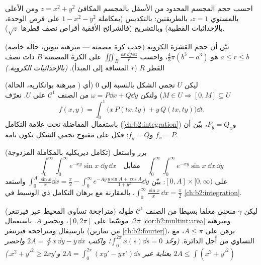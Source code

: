 \begin{exercise}[$\star\star$]\label{exo:b2:multint:6}
احسب حجم المجسم المحدود من الأسفل بالمجسم المكافئ $z
= x^2 + y^2$ ومن الأعلى
بالمستوي $z = 1$، بالطريقتين: بالتكديس (بمكاملة $1 - x^2 - y^2$ على قرص
الوحدة، بالإحداثيات القطبية) وبالتشريح (فالشرائح الأفقية أقراص نصف
قطرها $\sqrt z$).
\end{exercise}

\begin{exercise}[$\star\star$]\label{exo:b2:multint:7}
(جذب كرة مصمتة --- مبرهنة نيوتن، حالة خاصة) بيّن أن حجم القشرة
الكروية $a \leq r \leq
b$ هو $\frac43\pi(b^3 - a^3)$، واحسب $\iiint_{B}
\frac{\dd x\,\dd y\,\dd z}{r}$ على الكرة المصمتة $B$
ذات نصف القطر $R$ ($r$ المسافة إلى المبدأ). \emph{(بالإحداثيات
الكروية.)}
\end{exercise}

\begin{exercise}[$\star\star\star$]\label{exo:b2:multint:8}
(مبرهنة بوانكاريه، الحالة ) ليكن $U$ نجمي الشكل بالنسبة
إلى $0$ (أي $M \in U \Rightarrow [0, M] \subseteq U$) ولتكن $\omega = P\dd x + Q\dd y$  من الصنف $\mathcal{C}^1$
على $U$. نعرّف
\[
f(x, y) = \int_0^1 \bigl(x\,P(tx, ty) + y\,Q(tx, ty)\bigr)\dd t .
\]
باستعمال المفاضلة تحت علامة التكامل (\cref{ch:b2:integration}) و$P_y = Q_x$، بيّن أن
$f_x = P$ و$f_y = Q$: فكل  على مفتوح نجمي الشكل تكون تامة.
\end{exercise}

\begin{exercise}[$\star\star\star$]\label{exo:b2:multint:9}
(تكامل ديريكليه بالمكاملة المزدوجة) برر واستغل
\[
\int_0^\infty\!\!\int_0^\infty e^{-xy}\sin x\;\dd y\,\dd x
\quad\text{مقابل}\quad
\int_0^\infty\!\!\int_0^\infty e^{-xy}\sin x\;\dd x\,\dd y
\]
على $[0, A] \times [0, \infty)$: بيّن $\int_0^A \frac{\sin
x}{x}\dd x = \frac\pi2 - \int_0^\infty
e^{-Ay}\frac{y\sin A + \cos A}{1 + y^2}\dd y$ واستعد $\int_0^\infty \frac{\sin x}{x}\,\dd x = \frac\pi2$، بالمقارنة مع برهان التكامل
ذي الوسيط في \cref{ch:b2:integration}.
\end{exercise}

\begin{exercise}[$\star\star\star$]\label{exo:b2:multint:10}
(متراجحة تساوي المحيط عبر فيرتنغر) ليكن $\gamma$ منحنى مغلقا بسيطا
من الصنف $\mathcal{C}^1$ طوله $2\pi$، موسّما  على $[0, 2\pi]$، ويحصر
 $A$. باستعمال \cref{cor:b2:multint:area} ومبرهنة بارسيفال ومتراجحة فيرتنغر
(من تمارين \cref{ch:b2:fourier})، برهن على $A \leq \pi$، مع التساوي من أجل الدائرة.
\emph{(وحّد $\int_0^{2\pi} x(s)\dd s
= 0$؛ واكتب $2A = \oint x\,\dd y - y\,\dd x$ واحصر $2A \leq
\int (x^2 + y'^2)$ بعناية عبر $2A = \int_0^{2\pi}(xy' - yx')\dd
s$
و$x^2 + y'^2 \geq 2xy'$.)}
\end{exercise}

